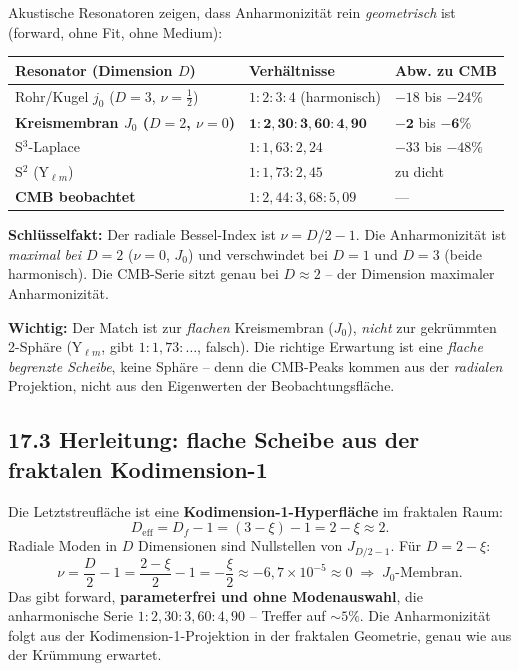 Akustische Resonatoren zeigen, dass Anharmonizität rein \emph{geometrisch}
ist (forward, ohne Fit, ohne Medium):

\begin{center}
\begin{tabular}{p{5.5cm}p{4.5cm}p{2cm}}
\toprule
\textbf{Resonator (Dimension $D$)} & \textbf{Verhältnisse} & \textbf{Abw. zu CMB} \\
\midrule
Rohr/Kugel $j_0$ ($D=3$, $\nu=\tfrac12$) & $1:2:3:4$ (harmonisch) & $-18$ bis $-24\%$ \\
\textbf{Kreismembran $J_0$ ($D=2$, $\nu=0$)} & $\mathbf{1:2{,}30:3{,}60:4{,}90}$ & $\mathbf{-2}$ bis $\mathbf{-6\%}$ \\
S$^3$-Laplace & $1:1{,}63:2{,}24$ & $-33$ bis $-48\%$ \\
S$^2$ (Y$_{\ell m}$) & $1:1{,}73:2{,}45$ & zu dicht \\
\midrule
\textbf{CMB beobachtet} & $1:2{,}44:3{,}68:5{,}09$ & --- \\
\bottomrule
\end{tabular}
\end{center}

\textbf{Schlüsselfakt:} Der radiale Bessel-Index ist $\nu = D/2-1$. Die
Anharmonizität ist \emph{maximal bei $D=2$} ($\nu=0$, $J_0$) und
verschwindet bei $D=1$ und $D=3$ (beide harmonisch). Die CMB-Serie sitzt
genau bei $D\approx2$ -- der Dimension maximaler Anharmonizität.

\textbf{Wichtig:} Der Match ist zur \emph{flachen} Kreismembran ($J_0$),
\emph{nicht} zur gekrümmten 2-Sphäre (Y$_{\ell m}$, gibt $1:1{,}73:\ldots$,
falsch). Die richtige Erwartung ist eine \emph{flache begrenzte Scheibe},
keine Sphäre -- denn die CMB-Peaks kommen aus der \emph{radialen}
Projektion, nicht aus den Eigenwerten der Beobachtungsfläche.

\subsection*{17.3 Herleitung: flache Scheibe aus der fraktalen Kodimension-1}

Die Letztstreufläche ist eine \textbf{Kodimension-1-Hyperfläche} im
fraktalen Raum:
\[
  D_\mathrm{eff} = D_f - 1 = (3-\xi) - 1 = 2 - \xi \approx 2.
\]
Radiale Moden in $D$ Dimensionen sind Nullstellen von $J_{D/2-1}$. Für
$D = 2-\xi$:
\[
  \nu = \frac{D}{2}-1 = \frac{2-\xi}{2}-1 = -\frac{\xi}{2}
      \approx -6{,}7\times10^{-5} \approx 0
  \;\Rightarrow\; J_0\text{-Membran}.
\]
Das gibt forward, \textbf{parameterfrei und ohne Modenauswahl}, die
anharmonische Serie $1:2{,}30:3{,}60:4{,}90$ -- Treffer auf $\sim5\%$.
Die Anharmonizität folgt aus der Kodimension-1-Projektion in der
fraktalen Geometrie, genau wie aus der Krümmung erwartet.

